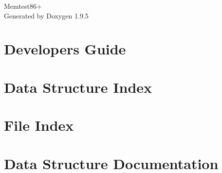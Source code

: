 \documentclass[twoside]{book}
\newcommand{\+}{\discretionary{\mbox{\scriptsize$\hookleftarrow$}}{}{}}
\newcommand{\clearemptydoublepage}{%
    \newpage{\pagestyle{empty}\cleardoublepage}%
  }
\begin{document}
  \raggedbottom
    \hypersetup{pageanchor=false,
                bookmarksnumbered=true,
                pdfencoding=unicode
               }
  \begin{titlepage}
  \vspace*{7cm}
  \begin{center}%
  {\Large Memtest86+}\\
  \vspace*{1cm}
  {\large Generated by Doxygen 1.9.5}\\
  \end{center}
  \end{titlepage}
  \clearemptydoublepage
  \tableofcontents
  \clearemptydoublepage
  \hypersetup{pageanchor=true}
\chapter{Developer\textquotesingle{}s Guide}
\label{index}\hypertarget{index}{}
\chapter{Data Structure Index}

\chapter{File Index}

\chapter{Data Structure Documentation}








\end{document}
